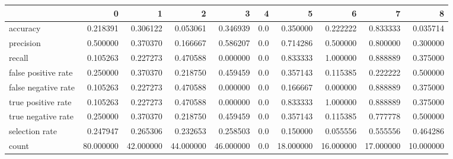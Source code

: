 \begin{tabular}{lrrrrrrrrr}
\toprule
{} &          0 &          1 &          2 &          3 &    4 &          5 &          6 &          7 &          8 \\
\midrule
accuracy            &   0.218391 &   0.306122 &   0.053061 &   0.346939 &  0.0 &   0.350000 &   0.222222 &   0.833333 &   0.035714 \\
precision           &   0.500000 &   0.370370 &   0.166667 &   0.586207 &  0.0 &   0.714286 &   0.500000 &   0.800000 &   0.300000 \\
recall              &   0.105263 &   0.227273 &   0.470588 &   0.000000 &  0.0 &   0.833333 &   1.000000 &   0.888889 &   0.375000 \\
false positive rate &   0.250000 &   0.370370 &   0.218750 &   0.459459 &  0.0 &   0.357143 &   0.115385 &   0.222222 &   0.500000 \\
false negative rate &   0.105263 &   0.227273 &   0.470588 &   0.000000 &  0.0 &   0.166667 &   0.000000 &   0.888889 &   0.375000 \\
true positive rate  &   0.105263 &   0.227273 &   0.470588 &   0.000000 &  0.0 &   0.833333 &   1.000000 &   0.888889 &   0.375000 \\
true negative rate  &   0.250000 &   0.370370 &   0.218750 &   0.459459 &  0.0 &   0.357143 &   0.115385 &   0.777778 &   0.500000 \\
selection rate      &   0.247947 &   0.265306 &   0.232653 &   0.258503 &  0.0 &   0.150000 &   0.055556 &   0.555556 &   0.464286 \\
count               &  80.000000 &  42.000000 &  44.000000 &  46.000000 &  0.0 &  18.000000 &  16.000000 &  17.000000 &  10.000000 \\
\bottomrule
\end{tabular}
